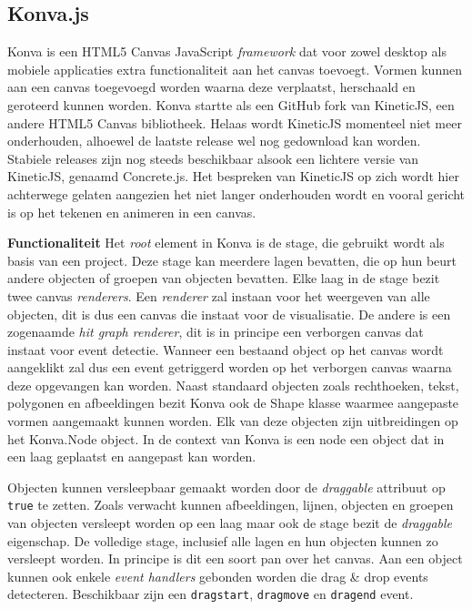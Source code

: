 \subsection{Konva.js} 
Konva is een HTML5 Canvas JavaScript \textit{framework} dat voor zowel desktop als mobiele applicaties extra functionaliteit aan het canvas toevoegt. Vormen kunnen aan een canvas toegevoegd worden waarna deze verplaatst, herschaald en geroteerd kunnen worden. Konva startte als een GitHub fork van KineticJS, een andere HTML5 Canvas bibliotheek. Helaas wordt KineticJS momenteel niet meer onderhouden, alhoewel de laatste release wel nog gedownload kan worden. Stabiele releases zijn nog steeds beschikbaar alsook een lichtere versie van KineticJS, genaamd Concrete.js. Het bespreken van KineticJS op zich wordt hier achterwege gelaten aangezien het niet langer onderhouden wordt en vooral gericht is op het tekenen en animeren in een canvas.

\textbf{Functionaliteit} \break
Het \textit{root} element in Konva is de stage, die gebruikt wordt als basis van een project. Deze stage kan meerdere lagen bevatten, die op hun beurt andere objecten of groepen van objecten bevatten. Elke laag in de stage bezit twee canvas \textit{renderers}. Een \textit{renderer} zal instaan voor het weergeven van alle objecten, dit is dus een canvas die instaat voor de visualisatie. De andere is een zogenaamde \textit{hit graph renderer}, dit is in principe een verborgen canvas dat instaat voor event detectie. Wanneer een bestaand object op het canvas wordt aangeklikt zal dus een event getriggerd worden op het verborgen canvas waarna deze opgevangen kan worden. Naast standaard objecten zoals rechthoeken, tekst, polygonen en afbeeldingen bezit Konva ook de Shape klasse waarmee aangepaste vormen aangemaakt kunnen worden. Elk van deze objecten zijn uitbreidingen op het Konva.Node object. In de context van Konva is een node een object dat in een laag geplaatst en aangepast kan worden. 

Objecten kunnen versleepbaar gemaakt worden door de \textit{draggable} attribuut op \texttt{true} te zetten. Zoals verwacht kunnen afbeeldingen, lijnen, objecten en groepen van objecten versleept worden op een laag maar ook de stage bezit de \textit{draggable} eigenschap. De volledige stage, inclusief alle lagen en hun objecten kunnen zo versleept worden. In principe is dit een soort pan over het canvas. Aan een object kunnen ook enkele \textit{event handlers} gebonden worden die drag \& drop events detecteren. Beschikbaar zijn een \texttt{dragstart}, \texttt{dragmove} en \texttt{dragend} event. 

